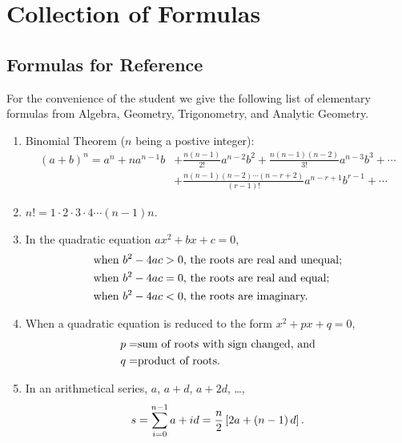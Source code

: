 \chapter{Collection of Formulas}
\label{ch:01}

\section{Formulas for Reference}
\label{sec:01:01}
For the convenience of the student we give the following list of elementary
formulas from Algebra, Geometry, Trigonometry, and Analytic Geometry.
\begin{enumerate}

\item
Binomial Theorem ($n$ being a postive integer):
\[
\begin{aligned}
\left(a + b\right)^n =
a^n + na^{n - 1}b &
+ \frac{n\left(n - 1\right)}{2!} a^{n - 2}b^2
+ \frac{n\left(n - 1\right)\left(n - 2\right)}{3!}a^{n - 3}b^3+\cdots\\ &
+ \frac{n\left(n - 1\right)\left(n - 2\right)\cdots
    \left(n - r + 2\right)}{\left(r - 1\right)!}a^{n - r + 1}b^{r - 1}
+\cdots
\end{aligned}
\]

\item
$n! = 1 \cdot 2 \cdot 3 \cdot 4 \cdots \left(n - 1\right)n$.

\item
In the quadratic equation $ax^2 + bx + c = 0$,
\[
\begin{aligned}
\textnormal{when }b^2 - 4ac & > 0\textnormal{, the roots are real and unequal;}\\
\textnormal{when }b^2 - 4ac & = 0\textnormal{, the roots are real and equal;}\\
\textnormal{when }b^2 - 4ac & < 0\textnormal{, the roots are imaginary.}
\end{aligned}
\]

\item
When a quadratic equation is reduced to the form $x^2 + px + q = 0$,
\[
\begin{aligned}
p= & \textnormal{sum of roots with sign changed, and}\\
q= & \textnormal{product of roots.}
\end{aligned}
\]

\item
In an arithmetical series, $a$, $a + d$, $a + 2d$, \ldots,
\[
s = \sum_{i = 0}^{n - 1} a + id
  = \frac{n}{2} \left[2a + \left(n - 1\right) d \right]
\textnormal{.}
\]


\end{enumerate}
